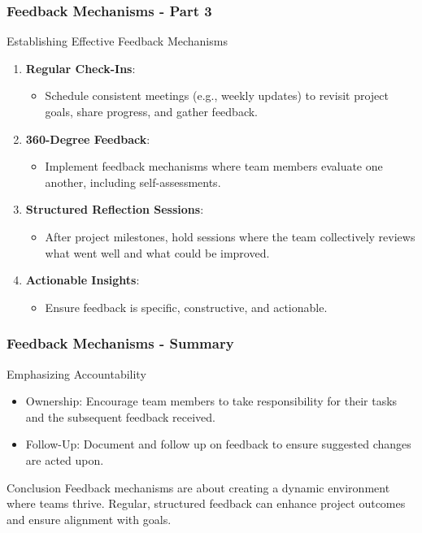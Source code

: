 \documentclass[aspectratio=169]{beamer}
\begin{document}
\begin{frame}[fragile]
    \frametitle{Feedback Mechanisms - Part 3}
    \begin{block}{Establishing Effective Feedback Mechanisms}
        \begin{enumerate}
            \item \textbf{Regular Check-Ins}:
            \begin{itemize}
                \item Schedule consistent meetings (e.g., weekly updates) to revisit project goals, share progress, and gather feedback.
            \end{itemize}
            \item \textbf{360-Degree Feedback}:
            \begin{itemize}
                \item Implement feedback mechanisms where team members evaluate one another, including self-assessments.
            \end{itemize}
            \item \textbf{Structured Reflection Sessions}:
            \begin{itemize}
                \item After project milestones, hold sessions where the team collectively reviews what went well and what could be improved.
            \end{itemize}
            \item \textbf{Actionable Insights}:
            \begin{itemize}
                \item Ensure feedback is specific, constructive, and actionable.
            \end{itemize}
        \end{enumerate}
    \end{block}
\end{frame}

\begin{frame}[fragile]
    \frametitle{Feedback Mechanisms - Summary}
    \begin{block}{Emphasizing Accountability}
        \begin{itemize}
            \item Ownership: Encourage team members to take responsibility for their tasks and the subsequent feedback received.
            \item Follow-Up: Document and follow up on feedback to ensure suggested changes are acted upon.
        \end{itemize}
    \end{block}
    
    \begin{block}{Conclusion}
        Feedback mechanisms are about creating a dynamic environment where teams thrive. Regular, structured feedback can enhance project outcomes and ensure alignment with goals.
    \end{block}
\end{frame}
\end{document}

